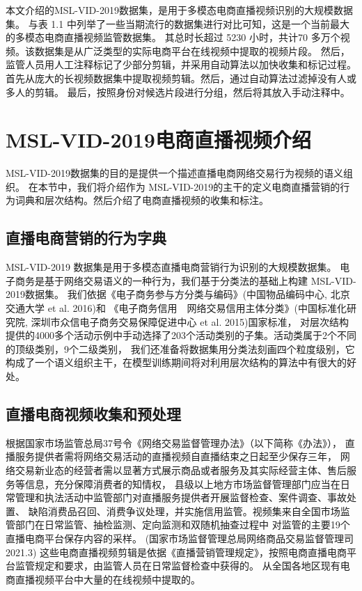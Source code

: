 本文介绍的MSL-VID-2019数据集，是用于多模态电商直播视频识别的大规模数据集。
与表 1.1 中列举了一些当期流行的数据集进行对比可知，这是一个当前最大的多模态电商直播视频监管数据集。
其总时长超过 5230 小时，共计70 多万个视频。该数据集是从广泛类型的实际电商平台在线视频中提取的视频片段。
然后，监管人员用人工注释标记了少部分剪辑，并采用自动算法以加快收集和标记过程。
首先从庞大的长视频数据集中提取视频剪辑。然后，通过自动算法过滤掉没有人或多人的剪辑。
最后，按照身份对候选片段进行分组，然后将其放入手动注释中。

\section{MSL-VID-2019电商直播视频介绍}

MSL-VID-2019数据集的目的是提供一个描述直播电商网络交易行为视频的语义组织。
在本节中，我们将介绍作为 MSL-VID-2019的主干的定义电商直播营销的行为词典和层次结构。然后介绍了电商直播视频的收集和标注。

\subsection{直播电商营销的行为字典}

MSL-VID-2019 数据集是用于多模态直播电商营销行为识别的大规模数据集。
电子商务是基于网络交易语义的一种行为，我们基于分类法的基础上构建 MSL-VID-2019数据集。
我们依据《电子商务参与方分类与编码》(中国物品编码中心, 北京交通大学 et al. 2016)和
《电子商务信用　网络交易信用主体分类》(中国标准化研究院, 深圳市众信电子商务交易保障促进中心 et al. 2015)国家标准，
对层次结构提供的4000多个活动示例中手动选择了203个活动类别的子集。活动类属于2个不同的顶级类别，9个二级类别，
我们还准备将数据集用分类法刻画四个粒度级别，它构成了一个语义组织主干，在模型训练期间将对利用层次结构的算法中有很大的好处。

\subsection{直播电商视频收集和预处理}

根据国家市场监管总局37号令《网络交易监督管理办法》（以下简称《办法》），
直播服务提供者需将网络交易活动的直播视频自直播结束之日起至少保存三年，
网络交易新业态的经营者需以显著方式展示商品或者服务及其实际经营主体、售后服务等信息，充分保障消费者的知情权，
县级以上地方市场监督管理部门应当在日常管理和执法活动中监管部门对直播服务提供者开展监督检查、案件调查、事故处置、
缺陷消费品召回、消费争议处理，并实施信用监管。视频集来自全国市场监管部门在日常监管、抽检监测、定向监测和双随机抽查过程中
对监管的主要19个直播电商平台保存内容的采样。
(国家市场监督管理总局网络商品交易监督管理司 2021.3)
这些电商直播视频剪辑是依据《直播营销管理规定》，按照电商直播电商平台监管规定和要求，由监管人员在日常监督检查中获得的。
从全国各地区现有电商直播视频平台中大量的在线视频中提取的。

